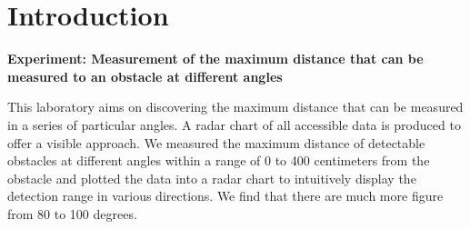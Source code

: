 
\section{Introduction}
\label{sec:introduction}

\textbf{Experiment: Measurement of the maximum distance that can be measured to an obstacle at different angles}

This laboratory aims on discovering the maximum distance that can be measured in a series of  particular angles.
A radar chart of all accessible data is produced to offer a visible approach.
We measured the maximum distance of detectable obstacles at different angles within
a range of 0 to 400 centimeters from the obstacle and plotted the data into a
radar chart to intuitively display the detection range in various directions.
We find that there are much more figure from 80 to 100 degrees.
